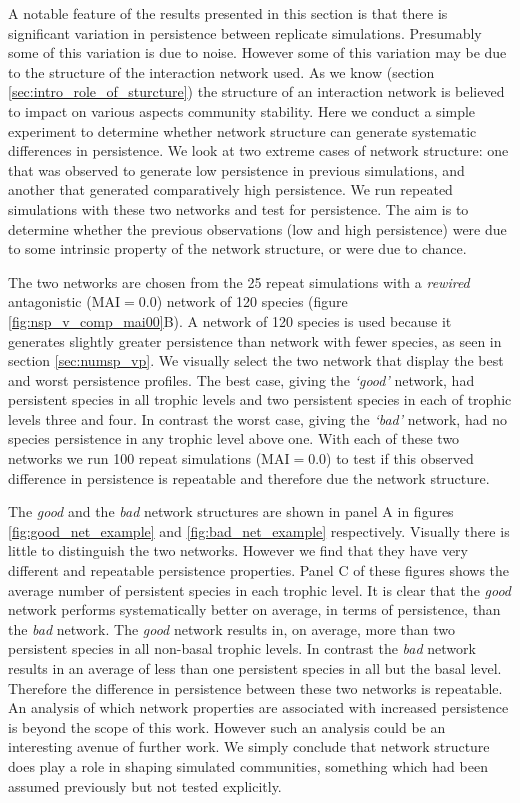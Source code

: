 A notable feature of the results presented in this section is that there is significant variation in persistence between replicate simulations. Presumably some of this variation is due to noise. However some of this variation may be due to the structure of the interaction network used. As we know (section \ref{sec:intro_role_of_sturcture}) the structure of an interaction network is believed to impact on various aspects community stability. Here we conduct a simple experiment to determine whether network structure can generate systematic differences in persistence. We look at two extreme cases of network structure: one that was observed to generate low persistence in previous simulations, and another that generated comparatively high persistence. We run repeated simulations with these two networks and test for persistence. The aim is to determine whether the previous observations (low and high persistence) were due to some intrinsic property of the network structure, or were due to chance.

The two networks are chosen from the 25 repeat simulations with a \emph{rewired} antagonistic (MAI$=0.0$) network of 120 species (figure \ref{fig:nsp_v_comp_mai00}B). A network of 120 species is used because it generates slightly greater persistence than network with fewer species, as seen in section \ref{sec:numsp_vp}. We visually select the two network that display the best and worst persistence profiles. The best case, giving the \emph{`good'} network, had persistent species in all trophic levels and two persistent species in each of trophic levels three and four. In contrast the worst case, giving the \emph{`bad'} network, had no species persistence in any trophic level above one. With each of these two networks we run 100 repeat simulations (MAI$=0.0$) to test if this observed difference in persistence is repeatable and therefore due the network structure.

The \emph{good} and the \emph{bad} network structures are shown in panel A in figures \ref{fig:good_net_example} and \ref{fig:bad_net_example} respectively. Visually there is little to distinguish the two networks. 
However we find that they have very different and repeatable persistence properties. Panel C of these figures shows the average number of persistent species in each trophic level. It is clear that the \emph{good} network performs systematically better on average, in terms of persistence, than the \emph{bad} network. The \emph{good} network results in, on average, more than two persistent species in all non-basal trophic levels. In contrast the \emph{bad} network results in an average of less than one persistent species in all but the basal level. Therefore the difference in persistence between these two networks is repeatable. An analysis of which network properties are associated with increased persistence is beyond the scope of this work. However such an analysis could be an interesting avenue of further work. We simply conclude that network structure does play a role in shaping simulated communities, something which had been assumed previously but not tested explicitly.

